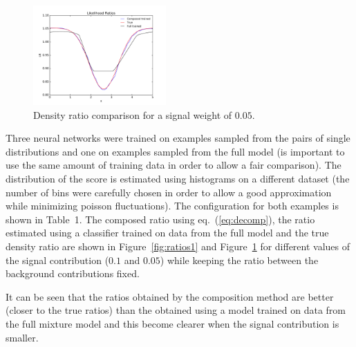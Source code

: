 \documentclass[a4paper]{jpconf}
\begin{document}
\begin{figure}[h]
\begin{minipage}{12pc}
\includegraphics[width=12pc]{all_train_mlp_ratio_05.pdf}
\caption{\label{fig:ratios2} Density ratio comparison for a signal weight of $0.05$.}
\end{minipage}
\end{figure}

Three neural networks were trained on examples sampled from the pairs of single distributions and one on examples sampled from the full model (is important to use the same amount of training data in order to allow a fair comparison). The distribution of the score is estimated using histograms on a different dataset (the number of bins were carefully chosen in order to allow a good approximation while minimizing poisson fluctuations). The configuration for both examples is shown in Table~1. The composed ratio using eq.~(\ref{eq:decomp}), the ratio estimated using a classifier trained on data from the full model and the true density ratio are shown in Figure~\ref{fig:ratios1} and Figure~\ref{fig:ratios2} for different values of the signal contribution ($0.1$ and $0.05$) while keeping the ratio between the background contributions fixed. 

It can be seen that the ratios obtained by the composition method are better (closer to the true ratios) than the obtained using a model trained on data from the full mixture model and this become clearer when the signal contribution is smaller.
\end{document}
